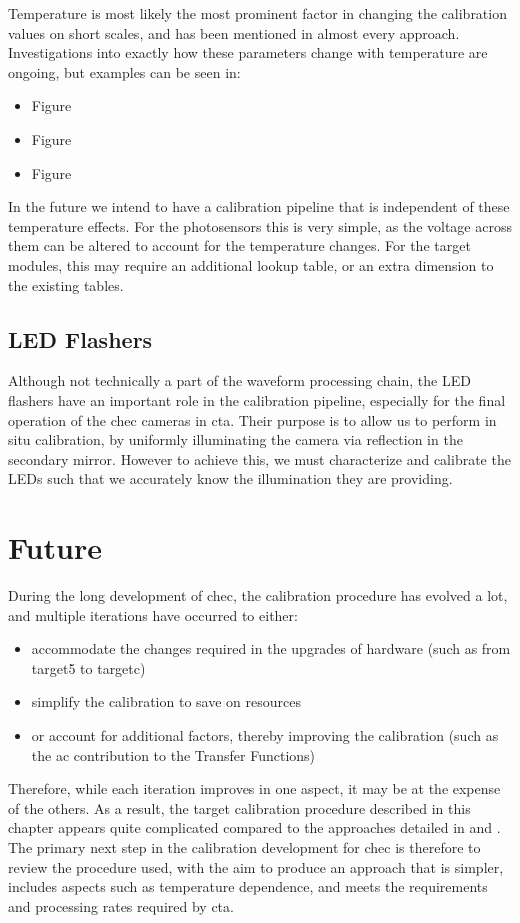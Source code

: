 Temperature is most likely the most prominent factor in changing the calibration values on short scales, and has been mentioned in almost every approach. Investigations into exactly how these parameters change with temperature are ongoing, but examples can be seen in:
\begin{itemize}
	\item Figure~
	\item Figure~
	\item Figure~
\end{itemize}
In the future we intend to have a calibration pipeline that is independent of these temperature effects. For the photosensors this is very simple, as the voltage across them can be altered to account for the temperature changes. For the \gls{target} modules, this may require an additional lookup table, or an extra dimension to the existing tables.

\subsection{LED Flashers}

Although not technically a part of the waveform processing chain, the LED flashers have an important role in the calibration pipeline, especially for the final operation of the \gls{chec} cameras in \gls{cta}. Their purpose is to allow us to perform in situ calibration, by uniformly illuminating the camera via reflection in the secondary mirror. However to achieve this, we must characterize and calibrate the LEDs such that we accurately know the illumination they are providing. 

\section{Future}

During the long development of \gls{chec}, the calibration procedure has evolved a lot, and multiple iterations have occurred to either:
\begin{itemize}
	\item accommodate the changes required in the upgrades of hardware (such as from \gls{target5} to \gls{targetc})
	\item simplify the calibration to save on resources
	\item or account for additional factors, thereby improving the calibration (such as the \gls{ac} contribution to the Transfer Functions)
\end{itemize}
Therefore, while each iteration improves in one aspect, it may be at the expense of the others. As a result, the \gls{target} calibration procedure described in this chapter appears quite complicated compared to the approaches detailed in \cite{Bechtol2012} and \cite{Albert2017}. The primary next step in the calibration development for \gls{chec} is therefore to review the procedure used, with the aim to produce an approach that is simpler, includes aspects such as temperature dependence, and meets the requirements and processing rates required by \gls{cta}.

